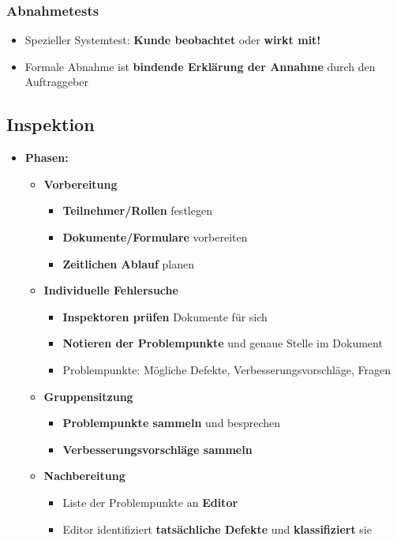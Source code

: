 \subsubsection{Abnahmetests}
			
\begin{itemize}
\item Spezieller Systemtest: \textbf{Kunde beobachtet} oder \textbf{wirkt mit!}
\item Formale Abnahme ist \textbf{bindende Erklärung der Annahme} durch den Auftraggeber
\end{itemize}
	
\subsection{Inspektion}
		
\begin{itemize}
\item \textbf{Phasen:}
\begin{itemize}
\item \textbf{Vorbereitung}
\begin{itemize}
\item \textbf{Teilnehmer/Rollen} festlegen
\item \textbf{Dokumente/Formulare} vorbereiten
\item \textbf{Zeitlichen Ablauf} planen
\end{itemize}
\item \textbf{Individuelle Fehlersuche}
\begin{itemize}
\item \textbf{Inspektoren prüfen} Dokumente für sich
\item \textbf{Notieren der Problempunkte} und genaue Stelle im Dokument
\item Problempunkte: Mögliche Defekte, Verbesserungsvorschläge, Fragen
\end{itemize}
\item \textbf{Gruppensitzung}
\begin{itemize}
\item \textbf{Problempunkte sammeln} und besprechen
\item \textbf{Verbesserungsvorschläge sammeln}
\end{itemize}
\item \textbf{Nachbereitung}
\begin{itemize}
\item Liste der Problempunkte an \textbf{Editor}
\item Editor identifiziert \textbf{tatsächliche Defekte} und \textbf{klassifiziert} sie

\end{itemize}
\end{itemize}
\end{itemize}
